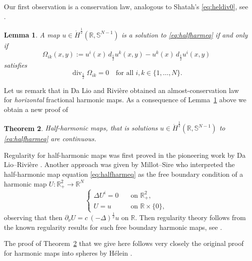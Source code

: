 \documentclass[12pt]{amsart}
\def\S{{\mathbb S}}
\newtheorem{theorem}{Theorem}
\newtheorem{lemma}[theorem]{Lemma}
\theoremstyle{definition}
\newcommand{\R}{\mathbb{R}}
\numberwithin{theorem}{section} \numberwithin{equation}{section}
\renewcommand{\div}{\operatorname{div}}
\newcommand{\lap}{\Delta }
\newcommand{\laph}{(-\lap)^{\frac{1}{2}}}
\begin{document}
Our first observation is a conservation law, analogous to Shatah's \eqref{eq:heldiv0}, see \cite{Shatah-1988}. 
\begin{lemma}\label{la:conservationlaw}
A map $u \in \dot{H}^{\frac{1}{2}}(\R,\S^{N-1})$ is a solution to \eqref{eq:halfharmeq} if and only if
\begin{equation}\label{eq:sphereomegadef}
 \Omega_{ik}(x,y) := u^i(x)\, d_{\frac{1}{2}} u^k(x,y) - u^k(x)\, d_{\frac{1}{2}} u^i(x,y)
\end{equation}
satisfies
\begin{equation}\label{eq:ourheldiv0}
 \div_{\frac{1}{2}} \Omega_{ik}  = 0 \quad \mbox{for all }i,k \in \{1,\ldots,N\}.
\end{equation}
\end{lemma}
Let us remark that in \cite{DaLio-Riviere-CAG} Da Lio and Rivi\`{e}re obtained an almost-conservation law for \emph{horizontal} fractional harmonic maps. As a consequence of Lemma~\ref{la:conservationlaw} above we obtain a new proof of
\begin{theorem}\label{th:halfharmreg}
Half-harmonic maps, that is solutions  $u \in \dot{H}^{\frac{1}{2}}(\R,\S^{N-1})$ to \eqref{eq:halfharmeq} are continuous.
\end{theorem}
Regularity for half-harmonic maps was first proved in the pioneering work by Da Lio--Rivi\`{e}re \cite{DaLio-Riviere-1Dsphere}. Another approach was given by Millot--Sire \cite{Millot-Sire-2015} who interpreted the half-harmonic map equation \eqref{eq:halfharmeq} as the free boundary condition of a harmonic map $U: \R^{2}_+ \to \R^N$
\[
 \begin{cases}
\lap U^i = 0 \quad &\mbox{on $\R^2_+$},\\
U = u \quad &\mbox{on $\R \times \{0\}$},
 \end{cases}
\]
observing that then $\partial_\nu U = c\ \laph u$ on $\R$. Then regularity theory follows from the known regularity results for such free boundary harmonic maps, see \cite{Scheven-2006}.


The proof of Theorem~\ref{th:halfharmreg} that we give here follows very closely the original proof for harmonic maps into spheres by H\'{e}lein \cite{Helein90}.
\end{document}
